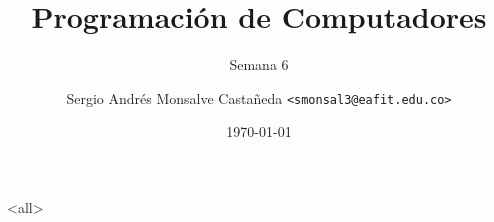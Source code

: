\documentclass[12pt]{beamer}
\title[ST0240-063]{Programación de Computadores}
\subtitle{Semana 6}
\author[]{Sergio Andrés Monsalve Castañeda \texttt{<smonsal3@eafit.edu.co>}}
\institute[Universidad EAFIT]{Universidad EAFIT}
\date{\today}
\begin{document}
\begin{frame}
  \titlepage
\end{frame}

\mode*

\mode<all>


% 


   
\end{document}
